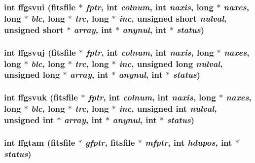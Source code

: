 \subsubsection{\setlength{\rightskip}{0pt plus 5cm}int ffgsvui (\bf{fitsfile} $\ast$ {\em fptr}, int {\em colnum}, int {\em naxis}, long $\ast$ {\em naxes}, long $\ast$ {\em blc}, long $\ast$ {\em trc}, long $\ast$ {\em inc}, unsigned short {\em nulval}, unsigned short $\ast$ {\em array}, int $\ast$ {\em anynul}, int $\ast$ {\em status})}\label{test_2shm__client_2fitsio_8h_87ccfd30c50f2289bde69e5d88519f19}


\subsubsection{\setlength{\rightskip}{0pt plus 5cm}int ffgsvuj (\bf{fitsfile} $\ast$ {\em fptr}, int {\em colnum}, int {\em naxis}, long $\ast$ {\em naxes}, long $\ast$ {\em blc}, long $\ast$ {\em trc}, long $\ast$ {\em inc}, unsigned long {\em nulval}, unsigned long $\ast$ {\em array}, int $\ast$ {\em anynul}, int $\ast$ {\em status})}\label{test_2shm__client_2fitsio_8h_5216e5258326fde9ddb6bc20a82e1070}


\subsubsection{\setlength{\rightskip}{0pt plus 5cm}int ffgsvuk (\bf{fitsfile} $\ast$ {\em fptr}, int {\em colnum}, int {\em naxis}, long $\ast$ {\em naxes}, long $\ast$ {\em blc}, long $\ast$ {\em trc}, long $\ast$ {\em inc}, unsigned int {\em nulval}, unsigned int $\ast$ {\em array}, int $\ast$ {\em anynul}, int $\ast$ {\em status})}\label{test_2shm__client_2fitsio_8h_2c12cc51e3a9ae09a587cad9d58ceb22}


\subsubsection{\setlength{\rightskip}{0pt plus 5cm}int ffgtam (\bf{fitsfile} $\ast$ {\em gfptr}, \bf{fitsfile} $\ast$ {\em mfptr}, int {\em hdupos}, int $\ast$ {\em status})}\label{test_2shm__client_2fitsio_8h_ae3ed6cd81ecb5001ff6abb808607eb3}


